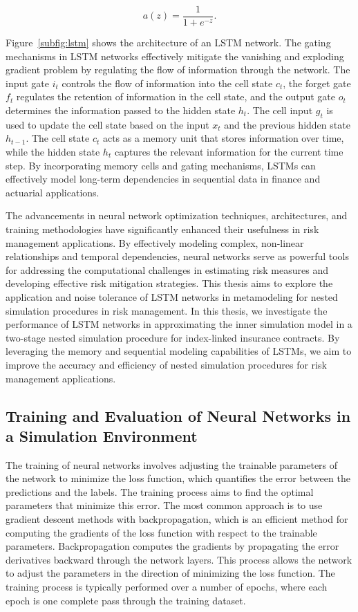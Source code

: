 \begin{equation*}
    a(z) = \frac{1}{1 + e^{-z}}.
\end{equation*}

Figure~\ref{subfig:lstm} shows the architecture of an LSTM network.
The gating mechanisms in LSTM networks effectively mitigate the vanishing and exploding gradient problem by regulating the flow of information through the network.
The input gate $i_t$ controls the flow of information into the cell state $c_t$, the forget gate $f_t$ regulates the retention of information in the cell state, and the output gate $o_t$ determines the information passed to the hidden state $h_t$.
The cell input $g_t$ is used to update the cell state based on the input $x_t$ and the previous hidden state $h_{t-1}$.
The cell state $c_t$ acts as a memory unit that stores information over time, while the hidden state $h_t$ captures the relevant information for the current time step.
By incorporating memory cells and gating mechanisms, LSTMs can effectively model long-term dependencies in sequential data in finance and actuarial applications.

The advancements in neural network optimization techniques, architectures, and training methodologies have significantly enhanced their usefulness in risk management applications.
By effectively modeling complex, non-linear relationships and temporal dependencies, neural networks serve as powerful tools for addressing the computational challenges in estimating risk measures and developing effective risk mitigation strategies.
This thesis aims to explore the application and noise tolerance of LSTM networks in metamodeling for nested simulation procedures in risk management.
In this thesis, we investigate the performance of LSTM networks in approximating the inner simulation model in a two-stage nested simulation procedure for index-linked insurance contracts.
By leveraging the memory and sequential modeling capabilities of LSTMs, we aim to improve the accuracy and efficiency of nested simulation procedures for risk management applications.

\subsection{Training and Evaluation of Neural Networks in a Simulation Environment}

The training of neural networks involves adjusting the trainable parameters of the network to minimize the loss function, which quantifies the error between the predictions and the labels.
The training process aims to find the optimal parameters that minimize this error.
The most common approach is to use gradient descent methods with backpropagation, which is an efficient method for computing the gradients of the loss function with respect to the trainable parameters.
Backpropagation computes the gradients by propagating the error derivatives backward through the network layers.
This process allows the network to adjust the parameters in the direction of minimizing the loss function.
The training process is typically performed over a number of epochs, where each epoch is one complete pass through the training dataset.

